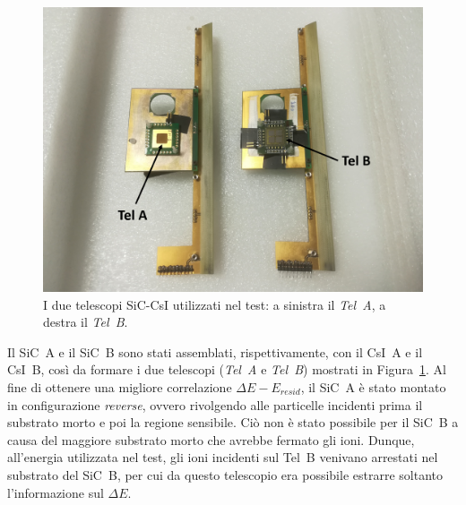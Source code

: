 \begin{figure} [!t]
	\centering
	\includegraphics[width=\textwidth, keepaspectratio]{Grafici/telescopi_etichette.png}
	\caption{I due telescopi SiC-CsI utilizzati nel test: a sinistra il \emph{Tel~A}, a destra il \emph{Tel~B}.} \label{fig:telescopi}
\end{figure}






Il SiC~A e il SiC~B sono stati assemblati, rispettivamente, con il CsI~A e il CsI~B, così da formare i due telescopi (\emph{Tel~A} e \emph{Tel~B}) mostrati in Figura~\ref{fig:telescopi}.
Al fine di ottenere una migliore correlazione $\Delta E - E_{resid}$, il SiC~A è stato montato in configurazione \emph{reverse}, ovvero rivolgendo alle particelle incidenti prima il substrato morto e poi la regione sensibile.
Ciò non è stato possibile per il SiC~B a causa del maggiore substrato morto che avrebbe fermato gli ioni.
Dunque, all'energia utilizzata nel test, gli ioni incidenti sul Tel~B venivano arrestati nel substrato del SiC~B, per cui da questo telescopio era possibile estrarre soltanto l'informazione sul $\Delta E$.

